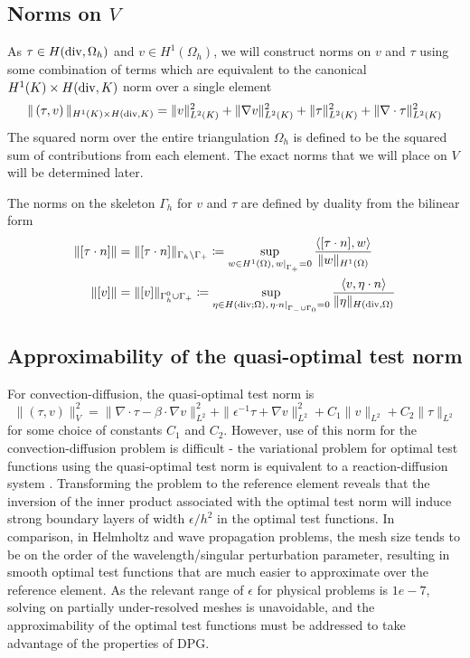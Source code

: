 \documentclass[11pt,onecolumn]{scrartcl}
\newcommand{\grad}{\nabla}
\renewcommand{\div}{\grad \cdot}
\begin{document}
\subsection{Norms on $V$}

As $\tau \in H({\rm div},\Omega_h)$ and $v \in H^1(\Omega_h)$, we will construct norms on $v$ and $\tau$ using some combination of terms which are equivalent to the canonical $H^1(K) \times H({\rm div},K)$ norm over a single element
\[
\|\left(\tau,v\right)\|_{H^1(K) \times H({\rm div},K)} = \|v\|_{L^2(K)}^2 + \|\grad v\|_{L^2(K)}^2  + \|\tau\|_{L^2(K)}^2 + \|\div \tau\|_{L^2(K)}^2
\]
The squared norm over the entire triangulation $\Omega_h$ is defined to be the squared sum of contributions from each element.  The exact norms that we will place on $V$ will be determined later. 

The norms on the skeleton $\Gamma_h$ for $v$ and $\tau$ are defined by duality from the bilinear form
\begin{align*}
\|[\tau\cdot n]\| &= \|[\tau\cdot n]\|_{\Gamma_h \setminus \Gamma_+} \coloneqq \sup_{w\in H^1(\Omega), \left.w\right|_{\Gamma_+} = 0} \frac{\langle [\tau \cdot n], w\rangle}{\|w\|_{H^1(\Omega)}}\\
\|[v]\|&=\|[v]\|_{\Gamma_h^0 \cup \Gamma_+} \coloneqq \sup_{\eta\in H({\rm div};\Omega), \left.\eta\cdot n\right|_{\Gamma_- \cup \Gamma_0} = 0} \frac{\langle v, \eta\cdot n\rangle}{\|\eta\|_{H({\rm div},\Omega)}}
\end{align*}

\subsection{Approximability of the quasi-optimal test norm}%

For convection-diffusion, the quasi-optimal test norm is 
\[
\|\left(\tau, v\right)\|_V^2 = \| \div \tau - \beta \cdot \grad v \|_{L^2}^2 + \| \epsilon^{-1} \tau + \grad v \|_{L^2}^2 + C_1\|v\|_{L^2} + C_2\|\tau\|_{L^2}
\]
for some choice of constants $C_1$ and $C_2$.  
However, use of this norm for the convection-diffusion problem is difficult - the variational problem for optimal test functions using the quasi-optimal test norm is equivalent to a reaction-diffusion system \cite{DBLP:journals/procedia/NiemiCC11}.  Transforming the problem to the reference element reveals that the inversion of the inner product associated with the optimal test norm will induce strong boundary layers of width $\epsilon/h^2$ in the optimal test functions.  In comparison, in Helmholtz and wave propagation problems, the mesh size tends to be on the order of the wavelength/singular perturbation parameter, resulting in smooth optimal test functions that are much easier to approximate over the reference element.  As the relevant range of $\epsilon$ for physical problems is $1e-7$, solving on partially under-resolved meshes is unavoidable, and the approximability of the optimal test functions must be addressed to take advantage of the properties of DPG.  
\end{document}
